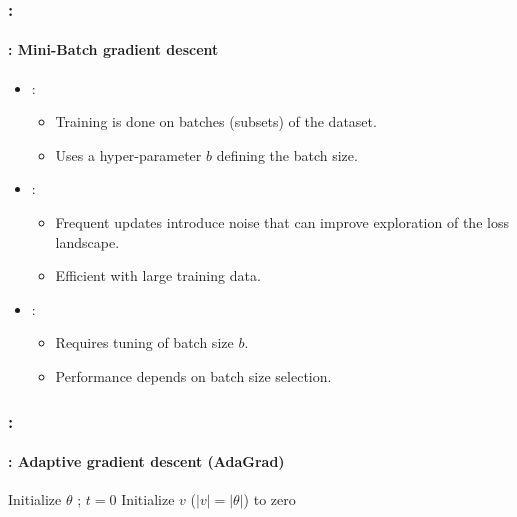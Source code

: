 \documentclass[xcolor=table]{beamer}
\begin{document}
\begin{frame}
	\frametitle{\insertshortsubtitle: \insertsection}
	\framesubtitle{\insertsubsection: Mini-Batch gradient descent}

	\begin{itemize}
		\item {}: 
		\begin{itemize}
			\item Training is done on batches (subsets) of the dataset.
			\item Uses a hyper-parameter $b$ defining the batch size.
		\end{itemize}
		\item {}: 
		\begin{itemize}
			\item Frequent updates introduce noise that can improve exploration of the loss landscape.
			\item Efficient with large training data.
		\end{itemize}
		\item {}: 
		\begin{itemize}
			\item Requires tuning of batch size $b$.
			\item Performance depends on batch size selection.
		\end{itemize}
	\end{itemize}

\end{frame}


\begin{frame}
	\frametitle{\insertshortsubtitle: \insertsection}
	\framesubtitle{\insertsubsection: Adaptive gradient descent (AdaGrad)}

	\begin{algorithm}[H]
		\KwResult{$ \theta $}
		Initialize $ \theta $ ; $ t = 0 $\;
		Initialize $v$ ($|v| = |\theta|$) to zero\;
		\caption{AdaGrad \cite{2011-duchi-al}}
	\end{algorithm}

\end{frame}
\end{document}
